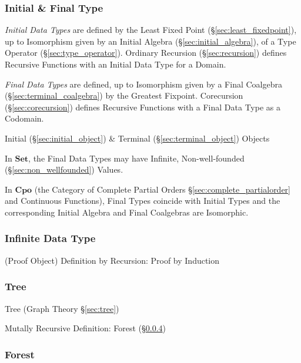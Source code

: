 \subsubsection{Initial \& Final Type}\label{sec:initial_final_type}

\emph{Initial Data Types} are defined by the Least Fixed Point
(\S\ref{sec:least_fixedpoint}), up to Isomorphism given by an Initial
Algebra (\S\ref{sec:initial_algebra}), of a Type Operator
(\S\ref{sec:type_operator}). Ordinary Recursion
(\S\ref{sec:recursion}) defines Recursive Functions with an Initial
Data Type for a Domain.

\emph{Final Data Types} are defined, up to Isomorphism given by a
Final Coalgebra (\S\ref{sec:terminal_coalgebra}) by the Greatest
Fixpoint. Corecursion (\S\ref{sec:corecursion}) defines Recursive
Functions with a Final Data Type as a Codomain.

Initial (\S\ref{sec:initial_object}) \& Terminal
(\S\ref{sec:terminal_object}) Objects

In $\mathbf{Set}$, the Final Data Types may have Infinite,
Non-well-founded (\S\ref{sec:non_wellfounded}) Values.

In $\mathbf{Cpo}$ (the Category of Complete Partial Orders
\S\ref{sec:complete_partialorder} and Continuous Functions), Final
Types coincide with Initial Types and the corresponding Initial
Algebra and Final Coalgebras are Isomorphic.



\subsubsection{Infinite Data Type}\label{sec:infinite_datatype}

(Proof Object) Definition by Recursion: Proof by Induction



\subsubsection{Tree}\label{sec:tree_type}

Tree (Graph Theory \S\ref{sec:tree})

Mutally Recursive Definition: Forest (\S\ref{sec:forest_type})



\subsubsection{Forest}\label{sec:forest_type}

